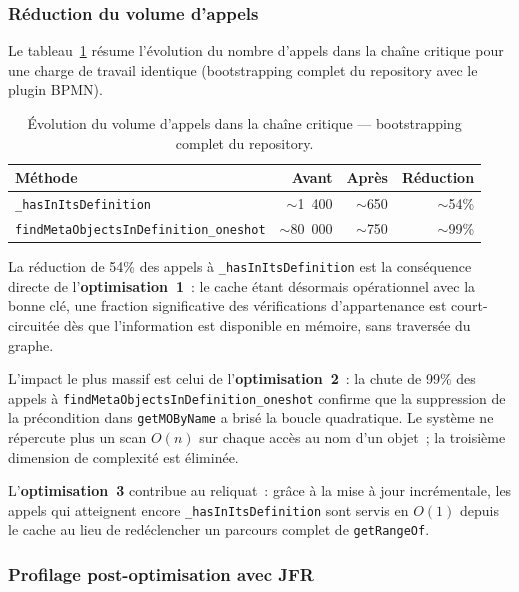 \subsubsection{Réduction du volume d'appels}

Le tableau~\ref{tab:appels-opti1} résume l'évolution du nombre d'appels
dans la chaîne critique pour une charge de travail identique (bootstrapping
complet du repository avec le plugin BPMN).

\begin{table}[h]
\centering
\caption{Évolution du volume d'appels dans la chaîne critique ---
bootstrapping complet du repository.}
\label{tab:appels-opti1}
\begin{tabular}{lrrr}
\hline
\textbf{Méthode} & \textbf{Avant} & \textbf{Après} &
\textbf{Réduction} \\
\hline
\texttt{\_hasInItsDefinition} & $\sim$1~400 & $\sim$650 & $\sim$54\% \\
\texttt{findMetaObjectsInDefinition\_oneshot} & $\sim$80~000 & $\sim$750 &
$\sim$99\% \\
\hline
\end{tabular}
\end{table}

La réduction de 54\% des appels à \texttt{\_hasInItsDefinition} est la
conséquence directe de l'\textbf{optimisation~1}~: le cache étant désormais
opérationnel avec la bonne clé, une fraction significative des vérifications
d'appartenance est court-circuitée dès que l'information est disponible en
mémoire, sans traversée du graphe.

L'impact le plus massif est celui de l'\textbf{optimisation~2}~: la chute
de 99\% des appels à \texttt{findMetaObjectsInDefinition\_oneshot} confirme
que la suppression de la précondition dans \texttt{getMOByName} a brisé la
boucle quadratique. Le système ne répercute plus un scan $O(n)$ sur chaque
accès au nom d'un objet~; la troisième dimension de complexité est
éliminée.

L'\textbf{optimisation~3} contribue au reliquat~: grâce à la mise à jour incrémentale, les appels qui atteignent encore \texttt{\_hasInItsDefinition} sont servis en $O(1)$ depuis le cache au lieu de redéclencher un parcours complet de \texttt{getRangeOf}.

\subsubsection{Profilage post-optimisation avec JFR}

